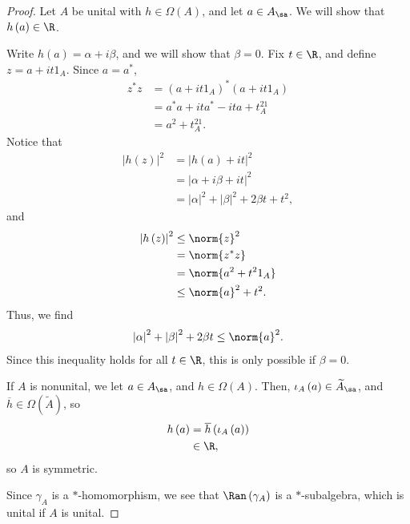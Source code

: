 \documentclass[10pt]{mypackage}
\begin{document}
\begin{proof}
  Let $A$ be unital with $h\in \Omega\left(A\right)$, and let $a\in A_{\sa}$. We will show that $h\left(a\right)\in \R$.\newline

  Write $h\left(a\right) = \alpha + i\beta$, and we will show that $\beta = 0$. Fix $t\in \R$, and define $z = a + it1_A$. Since $a = a^{\ast}$,
  \begin{align*}
    z^{\ast}z &= \left(a + it1_A\right)^{\ast}\left(a + it1_A\right)\\
              &= a^{\ast}a + ita^{\ast}-ita + t^21_A\\
              &= a^2 + t^21_A.
  \end{align*}
  Notice that
  \begin{align*}
    \left\vert h\left(z\right) \right\vert^2 &= \left\vert h\left(a\right) + it  \right\vert^2\\
                                             &= \left\vert \alpha + i\beta + it  \right\vert^2\\
                                             &= \left\vert \alpha \right\vert^2 + \left\vert \beta \right\vert^2 + 2\beta t + t^2,
  \end{align*}
  and
  \begin{align*}
    \left\vert h\left(z\right) \right\vert^2 &\leq \norm{z}^2\\
                                             &= \norm{z^{\ast}z}\\
                                             &= \norm{a^2 + t^21_A}\\
                                             &\leq \norm{a}^2 + t^2.
  \end{align*}
  Thus, we find
  \begin{align*}
    \left\vert \alpha \right\vert^2 + \left\vert \beta \right\vert^2 + 2\beta t \leq \norm{a}^2.
  \end{align*}
  Since this inequality holds for all $t\in \R$, this is only possible if $\beta = 0$.\newline

  If $A$ is nonunital, we let $a\in A_{\sa}$, and $h\in \Omega\left(A\right)$. Then, $\iota_A\left(a\right) \in \widetilde{A}_{\sa}$, and $\overline{h}\in \Omega\left(\widetilde{A}\right)$, so
  \begin{align*}
    h\left(a\right) &= \overline{h}\left(\iota_A\left(a\right)\right)\\
                    &\in \R,
  \end{align*}
  so $A$ is symmetric.\newline

  Since $\gamma_A$ is a $\ast$-homomorphism, we see that $\Ran\left(\gamma_A\right)$ is a $\ast$-subalgebra, which is unital if $A$ is unital.
\end{proof}
\end{document}
